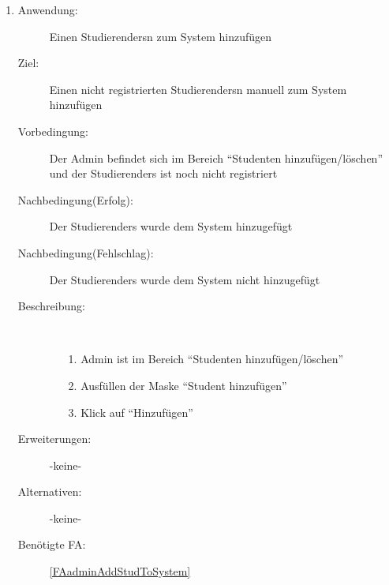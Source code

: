 \documentclass[parskip=full]{scrartcl}
\newcommand{\swtLabel}[1]{\textbf{/#1\arabic*0/}}
\begin{document}
\begin{enumerate} [label=\swtLabel{A}]
  \item \label{UCadminCreateStudierender}
    \begin{description}
  	\item[Anwendung:] Einen \glspl{Studierender}n zum System hinzufügen
  	\item[Ziel:] Einen nicht registrierten \glspl{Studierender}n manuell zum System
  	hinzufügen
  	\item[Vorbedingung:] Der \gls{Admin} befindet sich im Bereich
  	\enquote{Studenten hinzufügen/löschen} und der \glspl{Studierender} ist noch nicht
  	registriert
  	\item[Nachbedingung(Erfolg):] Der \glspl{Studierender} wurde dem System hinzugefügt
  	\item[Nachbedingung(Fehlschlag):] Der \glspl{Studierender} wurde dem System nicht
  	hinzugefügt
  	\item[Beschreibung:]~
  	\begin{enumerate}
  	  \item[1.] \gls{Admin} ist im Bereich \enquote{Studenten
  	  hinzufügen/löschen}
      \item[2.] Ausfüllen der Maske \enquote{Student hinzufügen}
      \item[3.] Klick auf \enquote{Hinzufügen}
  	\end{enumerate}
  	\item[Erweiterungen:] -keine-
  	\item[Alternativen:] -keine-
  	\item[Benötigte FA:] \ref{FAadminAddStudToSystem}
  \end{description}
  

\end{enumerate}
\end{document}
